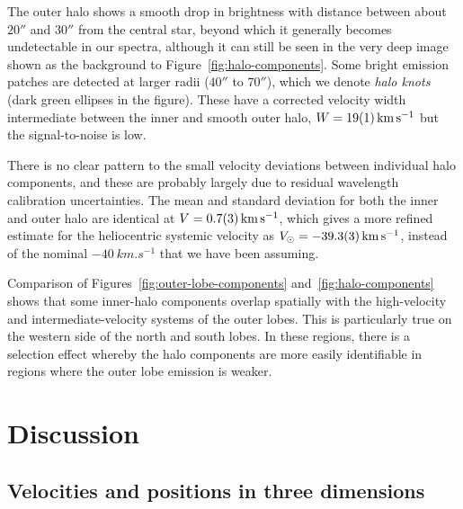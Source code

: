 \documentclass[useAMS, usenatbib]{mnras}
\begin{document}
The outer halo shows a smooth drop in brightness with distance
between about \(20''\) and \(30''\) from the central star,
beyond which it generally becomes undetectable in our spectra,
although it can still be seen in the very deep image shown as the background to Figure~\ref{fig:halo-components}.
Some bright emission patches are detected at larger radii
(\(40''\) to \(70''\)),
which we denote \textit{halo knots} (dark green ellipses in the figure).
These have a corrected velocity width intermediate between the inner and smooth outer halo,
\(W = \SI{19 \pm 1}{km.s^{-1}}\) but the signal-to-noise is low.

There is no clear pattern to the small velocity deviations between individual halo components,
and these are probably largely due to residual wavelength calibration uncertainties.
The mean and standard deviation for both the inner and outer halo are identical at \(V = \SI{+0.7 \pm 0.3}{km.s^{-1}}\),
which gives a more refined estimate for the heliocentric systemic velocity as
\(V_\odot = \SI{-39.3 \pm 0.3}{km.s^{-1}} \),
instead of the nominal \(\SI{-40}{km.s^{-1}}\) that we have been assuming.

Comparison of Figures~\ref{fig:outer-lobe-components} and~\ref{fig:halo-components}
shows that some inner-halo components overlap spatially with the high-velocity and intermediate-velocity systems of the outer lobes.
This is particularly true on the western side of the north and south lobes.
In these regions, there is a selection effect whereby
the halo components are more easily identifiable in regions where the outer lobe emission is weaker. 

\section{Discussion}
\label{sec:discussion}

\subsection{Velocities and positions in three dimensions}
\label{sec:veloc-posit-three}
\end{document}

